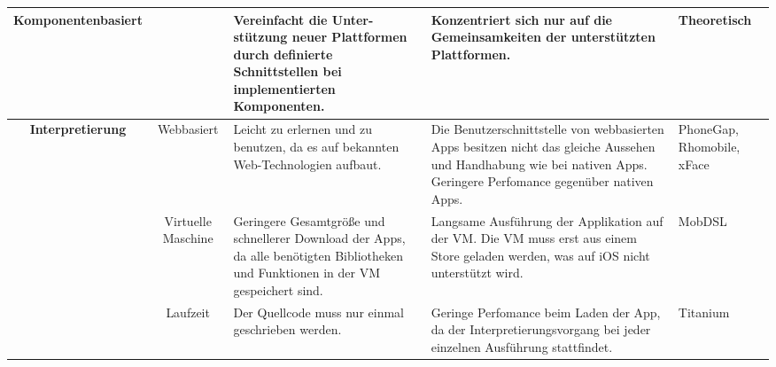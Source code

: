 \begin{table}[htbp]
{\begin{tabular}{|c|c|p{5cm}|p{6cm}|p{}|}
			\textbf{Komponentenbasiert}            &                                             & Vereinfacht die Unter-stützung neuer Plattformen durch definierte Schnittstellen bei implementierten Komponenten.                                                                                                                                                                                                                 & Konzentriert sich nur auf die Gemeinsamkeiten der unterstützten Plattformen.                                                                                                                           & Theoretisch                                                                                                                                        \\ \hline
			\textbf{Interpretierung}                & Webbasiert                                  & Leicht zu erlernen und zu benutzen, da es auf bekannten Web-Technologien aufbaut.                                                                                                                                                                                                                                                & Die Benutzerschnittstelle von webbasierten Apps besitzen nicht das gleiche Aussehen und Handhabung wie bei nativen Apps. Geringere Perfomance gegenüber nativen Apps.                                  & PhoneGap, Rhomobile, xFace                                            \\ \hline
			\textbf{}                              & Virtuelle Maschine                          & Geringere Gesamtgröße und schnellerer Download der Apps, da alle benötigten Bibliotheken und Funktionen in der VM gespeichert sind.                                                                                                                                                                                              & Langsame Ausführung der Applikation auf der VM. Die VM muss erst aus einem Store geladen werden, was auf iOS nicht unterstützt wird.                                                                   & MobDSL                                                                                                                                               \\ \hline
			\textbf{}                              & Laufzeit                                    & Der Quellcode muss nur einmal geschrieben werden.                                                                                                                                                                                                                                                                                & Geringe Perfomance beim Laden der App, da der Interpretierungsvorgang bei jeder einzelnen Ausführung stattfindet.                                                                               & Titanium                                       \\ \hline

\end{tabular}}
\end{table}
